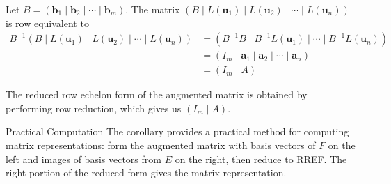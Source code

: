 \documentclass[12pt,a4paper]{article}
\newcommand{\vv}[1]{\mathbf{#1}}
\begin{document}
	\begin{proofbox}
		
		Let $B = (\vv{b}_1 \mid \vv{b}_2 \mid \cdots \mid \vv{b}_m)$. The matrix $(B \mid L(\vv{u}_1) \mid L(\vv{u}_2) \mid \cdots \mid L(\vv{u}_n))$ is row equivalent to
		\begin{align*}
			B^{-1}(B \mid L(\vv{u}_1) \mid L(\vv{u}_2) \mid \cdots \mid L(\vv{u}_n)) &= (B^{-1}B \mid B^{-1}L(\vv{u}_1) \mid \cdots \mid B^{-1}L(\vv{u}_n)) \\
			&= (I_m \mid \vv{a}_1 \mid \vv{a}_2 \mid \cdots \mid \vv{a}_n) \\
			&= (I_m \mid A)
		\end{align*}
		
		The reduced row echelon form of the augmented matrix is obtained by performing row reduction, which gives us $(I_m \mid A)$.
		
	\end{proofbox}
	
	\begin{remark}{Practical Computation}
		The corollary provides a practical method for computing matrix representations: form the augmented matrix with basis vectors of $F$ on the left and images of basis vectors from $E$ on the right, then reduce to RREF. The right portion of the reduced form gives the matrix representation.
	\end{remark}
	
\end{document}
